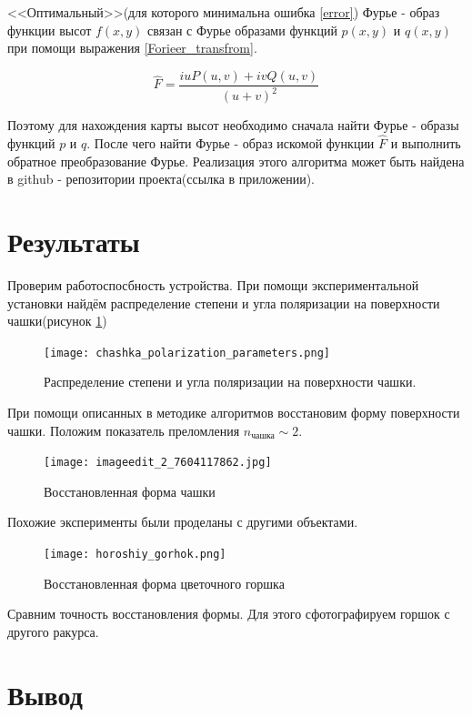 \documentclass[a4paper]{article}
\begin{document}
<<Оптимальный>>(для которого минимальна ошибка \ref{error}) Фурье - образ функции высот $f(x, y)$ связан с Фурье образами функций $p(x, y)$ и $q(x, y)$ при помощи выражения \ref{Forieer_transfrom}.

\begin{equation}
\hat{F} = \frac{i u P(u, v) + i v Q(u, v)}{(u + v)^{2}}
\label{Forieer_transfrom}
\end{equation}

Поэтому для нахождения карты высот необходимо сначала найти Фурье - образы функций $p$ и  $q$. После чего найти Фурье - образ искомой функции $\hat{F}$ и выполнить обратное преобразование Фурье. Реализация этого алгоритма может быть найдена в github - репозитории проекта(ссылка в приложении).

\section*{\textcolor{header}{Результаты}}

Проверим работоспосбность устройства. При помощи экспериментальной установки найдём распределение степени и угла поляризации на поверхности чашки(рисунок \ref{fig:chashka_polarization_parameters})


\begin{figure}[htbp]
  \centering
  \texttt{[image: chashka\_polarization\_parameters.png]}
  \caption{Распределение степени и угла поляризации на поверхности чашки.}
  \label{fig:chashka_polarization_parameters}
\end{figure}

При помощи описанных в методике алгоритмов восстановим форму поверхности чашки. Положим показатель преломления $n_{\text{чашка}} \sim 2$.

\begin{figure}[htbp]
  \centering
  \texttt{[image: imageedit\_2\_7604117862.jpg]}
  \label{fig:chashka_3d}
  \caption{Восстановленная форма чашки}
\end{figure}

Похожие эксперименты были проделаны с другими объектами. 

\begin{figure}[htbp]
  \centering
  \texttt{[image: horoshiy\_gorhok.png]}
  \label{fig:gorshok_3d}
  \caption{Восстановленная форма цветочного горшка}
\end{figure}

Сравним точность восстановления формы. Для этого сфотографируем горшок с другого ракурса.

\section*{\textcolor{header}{Вывод}}
\end{document}
